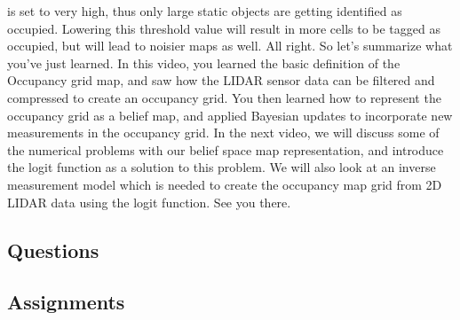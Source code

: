 is set to very high, thus only large static objects are getting identified
as occupied. Lowering this threshold
value will result in more cells to be
tagged as occupied, but will lead to noisier
maps as well. All right. So let's summarize what
you've just learned. In this video, you learned the basic definition of
the Occupancy grid map, and saw how the LIDAR
sensor data can be filtered and compressed to create
an occupancy grid. You then learned how to represent the occupancy grid
as a belief map, and applied Bayesian updates to incorporate new measurements
in the occupancy grid. In the next video, we will discuss some of
the numerical problems with our belief space
map representation, and introduce the logit function as a solution to this problem. We will also look at an inverse measurement model
which is needed to create the occupancy map grid
from 2D LIDAR data using the logit function.
See you there.


\subsection{Questions}


\subsection{Assignments}